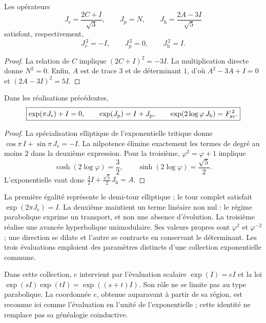 \begin{proposition}
\label{euler-trit-generadores}
Les opérateurs
\[
 J_{\mathrm e}=\frac{2C+I}{\sqrt3},\qquad
 J_{\mathrm p}=N,\qquad
 J_{\mathrm h}=\frac{2A-3I}{\sqrt5}
\]
satisfont, respectivement,
\[
 J_{\mathrm e}^{\,2}=-I,\qquad
 J_{\mathrm p}^{\,2}=0,\qquad
 J_{\mathrm h}^{\,2}=I.
\]
\end{proposition}
\begin{proof}
La relation de \(C\) implique \((2C+I)^2=-3I\).
La multiplication directe donne \(N^2=0\).
Enfin, \(A\) est de trace \(3\) et de déterminant \(1\), d’où
\(A^2-3A+I=0\) et \((2A-3I)^2=5I\).
\end{proof}

\begin{proposition}
\label{euler-trit-evaluaciones}
Dans les réalisations précédentes,
\begin{equation}
 \boxed{
 \exp(\pi J_{\mathrm e})+I=0,\qquad
 \exp(J_{\mathrm p})=I+J_{\mathrm p},\qquad
 \exp(2\log\varphi\,J_{\mathrm h})=F_{\rm av}^{\,2}.}
 \label{euler-trit-tres-evaluaciones}
\end{equation}
\end{proposition}
\begin{proof}
La spécialisation elliptique de l’exponentielle tritique donne
\(\cos\pi\,I+\sin\pi\,J_{\mathrm e}=-I\).
La nilpotence élimine exactement les termes de degré au moins \(2\)
dans la deuxième expression. Pour la troisième, \(\varphi^2=\varphi+1\) implique
\[
 \cosh(2\log\varphi)=\frac32,\qquad
 \sinh(2\log\varphi)=\frac{\sqrt5}{2}.
\]
L’exponentielle vaut donc
\(\frac32I+\frac{\sqrt5}{2}J_{\mathrm h}=A\).
\end{proof}

La première égalité représente le demi-tour elliptique ; le tour complet
satisfait \(\exp(2\pi J_{\mathrm e})=I\). La deuxième maintient un terme
linéaire non nul : le régime parabolique exprime un transport, et non une absence
d'évolution. La troisième réalise une avancée hyperbolique unimodulaire. Ses
valeurs propres sont \(\varphi^2\) et \(\varphi^{-2}\) ; une direction se dilate et
l'autre se contracte en conservant le déterminant. Les trois évaluations
emploient des paramètres distincts d'une collection exponentielle commune.

Dans cette collection, \(e\) intervient par l'évaluation scalaire
\(\exp(I)=eI\) et la loi \(\exp(sI)\exp(tI)=\exp((s+t)I)\).
Son rôle ne se limite pas au type parabolique. La coordonnée \(e\), obtenue
auparavant à partir de sa région, est reconnue ici comme l'évaluation en l'unité
de l'exponentielle ; cette identité ne remplace pas sa généalogie coinductive.

